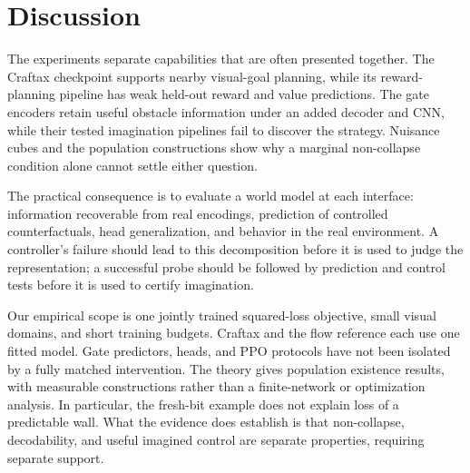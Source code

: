 \section{Discussion}
\label{sec:limitations}

The experiments separate capabilities that are often presented together. The Craftax checkpoint
supports nearby visual-goal planning, while its reward-planning pipeline has weak held-out reward and value
predictions. The gate encoders retain useful obstacle information under an added decoder and CNN,
while their tested imagination pipelines fail to discover the strategy. Nuisance cubes and the
population constructions show why a marginal non-collapse condition alone cannot settle either
question.

The practical consequence is to evaluate a world model at each interface: information recoverable
from real encodings, prediction of controlled counterfactuals, head generalization, and behavior in
the real environment. A controller's failure should lead to this decomposition before it is used to
judge the representation; a successful probe should be followed by prediction and control tests
before it is used to certify imagination.

Our empirical scope is one jointly trained squared-loss objective, small visual domains, and short
training budgets. Craftax and the flow reference each use one fitted model. Gate predictors, heads,
and PPO protocols have not been isolated by a fully matched intervention. The theory gives
population existence results, with measurable constructions rather than a finite-network or
optimization analysis. In particular, the fresh-bit example does not explain loss of a predictable
wall. What the evidence does establish is that non-collapse, decodability, and useful imagined
control are separate properties, requiring separate support.
